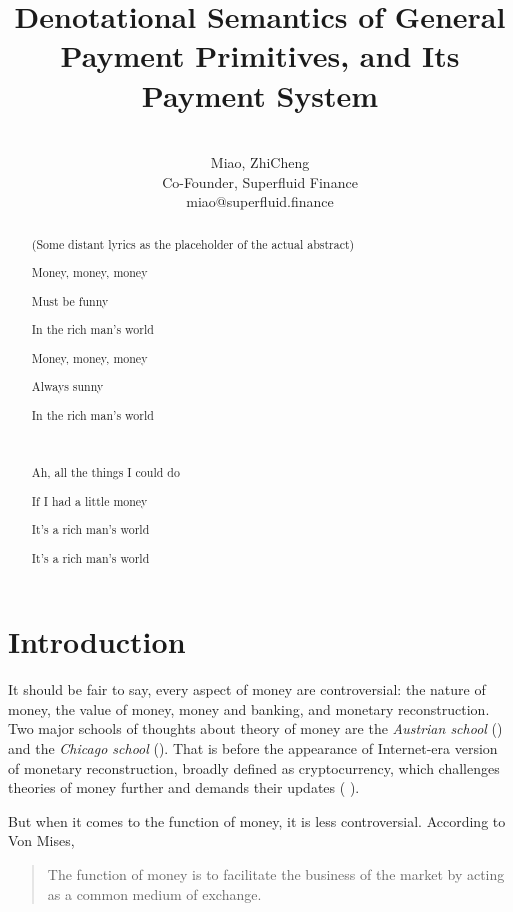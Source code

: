 \documentclass[a4paper]{report}
\title{Denotational Semantics of General Payment Primitives, and Its Payment System}
\author{\\
    Miao, ZhiCheng\\
    Co-Founder, Superfluid Finance\\
    miao@superfluid.finance
}
\begin{document}
\maketitle

\begin{abstract}
    \begin{center}
        (Some distant lyrics as the placeholder of the actual abstract)

        Money, money, money

        Must be funny

        In the rich man's world

        Money, money, money

        Always sunny

        In the rich man's world

        \

        Ah, all the things I could do

        If I had a little money

        It's a rich man's world

        It's a rich man's world
    \end{center}
\end{abstract}

\chapter{Introduction}

It should be fair to say, every aspect of money are controversial: the nature of money, the value of money, money and
banking, and monetary reconstruction. Two major schools of thoughts about theory of money are the \textit{Austrian
    school} (\cite{von2013theory}) and the \textit{Chicago school} (\cite{friedman1989quantity}). That is before the
appearance of Internet-era version of monetary reconstruction, broadly defined as cryptocurrency, which challenges
theories of money further and demands their updates (\cite{ammous2018can} \cite{hardle2020understanding}).

But when it comes to the function of money, it is less controversial. According to Von Mises,

\begin{quotation}
The function of money is to facilitate the business of the market by acting as a common medium of
exchange. 
\end{quotation}
\end{document}
